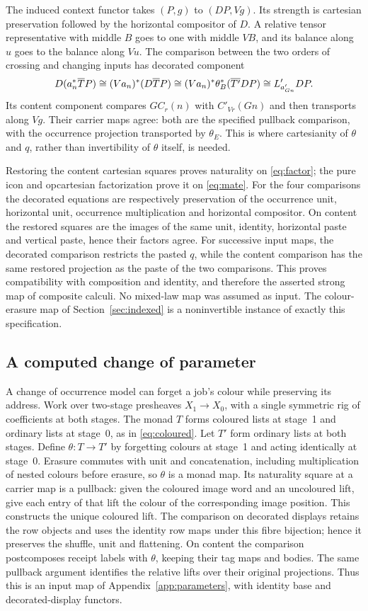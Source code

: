 \documentclass[11pt]{article}
\numberwithin{equation}{section}
\theoremstyle{definition}\newtheorem{definition}[theorem]{Definition}
\begin{document}
The induced context functor takes $(P,g)$ to $(DP,Vg)$. Its strength is
cartesian preservation followed by the horizontal compositor of $D$.
A relative tensor representative with middle $B$ goes to one with middle
$VB$, and its balance along $u$ goes to the balance along $Vu$.
The comparison between the two orders of crossing and changing inputs
has decorated component
\[
 D(a_n^*\overline T P)\cong(Va_n)^*(D\overline T P)
 \cong(Va_n)^*\theta_B^*(\overline{T'}DP)
 \cong L'_{a'_{Gn}}DP.
\]
Its content component compares $GC_r(n)$ with $C'_{Vr}(Gn)$ and then
transports along $Vg$. Their carrier maps agree: both are the specified
pullback comparison, with the occurrence projection transported by
$\theta_E$. This is where cartesianity of $\theta$ and $q$, rather than
invertibility of $\theta$ itself, is needed.

Restoring the content cartesian squares proves naturality on
\eqref{eq:factor}; the pure icon and opcartesian factorization prove it
on \eqref{eq:mate}. For the four comparisons the decorated equations
are respectively preservation of the occurrence unit, horizontal unit,
occurrence multiplication and horizontal compositor. On content the
restored squares are the images of the same unit, identity, horizontal
paste and vertical paste, hence their factors agree. For successive input
maps, the decorated comparison restricts the pasted $q$, while the
content comparison has the same restored projection as the paste of the
two comparisons. This proves compatibility with composition and identity,
and therefore the asserted strong map of composite calculi. No mixed-law
map was assumed as input. The colour-erasure map of Section~\ref{sec:indexed}
is a noninvertible instance of exactly this specification.

\subsection{A computed change of parameter}\label{app:colour}
A change of occurrence model can forget a job's colour while preserving
its address. Work over two-stage presheaves \(X_1\to X_0\), with a
single symmetric rig of coefficients at both stages. The monad \(T\)
forms coloured lists at stage~1 and ordinary lists at stage~0, as in
\eqref{eq:coloured}. Let \(T'\) form ordinary lists at both stages.
Define \(\theta:T\to T'\) by forgetting colours at stage~1 and acting
identically at stage~0. Erasure commutes with unit and concatenation,
including multiplication of nested colours before erasure, so $\theta$
is a monad map. Its naturality square at a carrier map is a pullback:
given the coloured image word and an uncoloured lift, give each entry
of that lift the colour of the corresponding image position. This
constructs the unique coloured lift. The comparison on decorated
displays retains the row objects and uses the identity row maps under
this fibre bijection; hence it preserves the shuffle, unit and
flattening. On content the comparison postcomposes receipt labels
with $\theta$, keeping their tag maps and bodies. The same pullback
argument identifies the relative lifts over their original projections.
Thus this is an input map of Appendix~\ref{app:parameters}, with
identity base and decorated-display functors.
\end{document}

